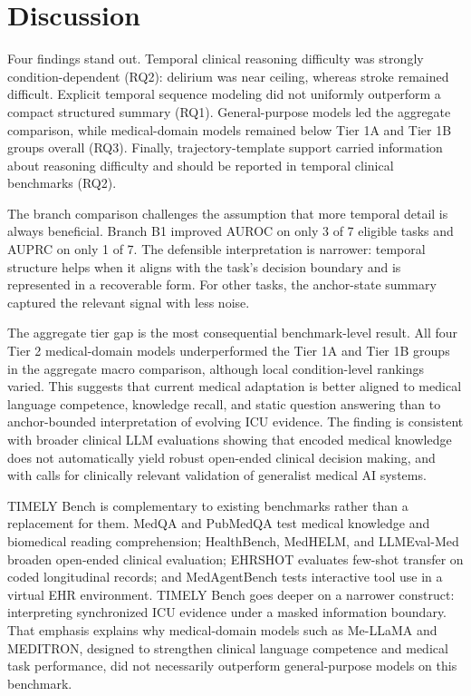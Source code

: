 \documentclass[pdflatex,sn-nature]{sn-jnl}
\begin{document}




\FloatBarrier

\section{Discussion}

Four findings stand out. Temporal clinical reasoning difficulty was strongly condition-dependent (RQ2): delirium was near ceiling, whereas stroke remained difficult. Explicit temporal sequence modeling did not uniformly outperform a compact structured summary (RQ1). General-purpose models led the aggregate comparison, while medical-domain models remained below Tier 1A and Tier 1B groups overall (RQ3). Finally, trajectory-template support carried information about reasoning difficulty and should be reported in temporal clinical benchmarks (RQ2).

The branch comparison challenges the assumption that more temporal detail is always beneficial. Branch B1 improved AUROC on only 3 of 7 eligible tasks and AUPRC on only 1 of 7. The defensible interpretation is narrower: temporal structure helps when it aligns with the task's decision boundary and is represented in a recoverable form. For other tasks, the anchor-state summary captured the relevant signal with less noise.

The aggregate tier gap is the most consequential benchmark-level result. All four Tier 2 medical-domain models underperformed the Tier 1A and Tier 1B groups in the aggregate macro comparison, although local condition-level rankings varied. This suggests that current medical adaptation is better aligned to medical language competence, knowledge recall, and static question answering than to anchor-bounded interpretation of evolving ICU evidence. The finding is consistent with broader clinical LLM evaluations showing that encoded medical knowledge does not automatically yield robust open-ended clinical decision making\cite{singhal2023clinicalknowledge,hager2024clinicaldecision}, and with calls for clinically relevant validation of generalist medical AI systems\cite{moor2023gmai,saab2024gemini}.

TIMELY Bench is complementary to existing benchmarks rather than a replacement for them. MedQA and PubMedQA test medical knowledge and biomedical reading comprehension\cite{jin2021medqa,jin2019pubmedqa}; HealthBench, MedHELM, and LLMEval-Med broaden open-ended clinical evaluation\cite{arora2025healthbench,bedi2025medhelm,zhang2025llmevalmed}; EHRSHOT evaluates few-shot transfer on coded longitudinal records\cite{wornow2023ehrshot}; and MedAgentBench tests interactive tool use in a virtual EHR environment\cite{jiang2025medagentbench}. TIMELY Bench goes deeper on a narrower construct: interpreting synchronized ICU evidence under a masked information boundary. That emphasis explains why medical-domain models such as Me-LLaMA and MEDITRON, designed to strengthen clinical language competence and medical task performance\cite{xie2025mellama,chen2023meditron}, did not necessarily outperform general-purpose models on this benchmark.
\end{document}
